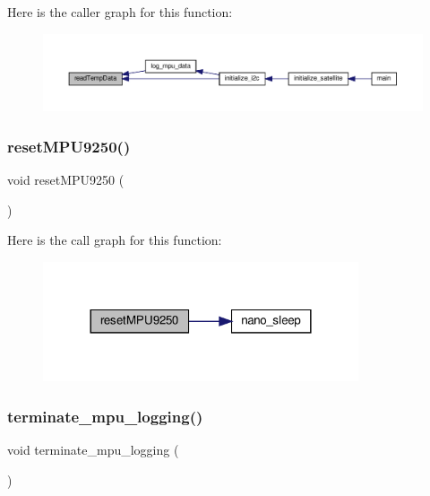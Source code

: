 Here is the caller graph for this function\+:\nopagebreak
\begin{figure}[H]
\begin{center}
\leavevmode
\includegraphics[width=350pt]{i2c-interface_8c_aa12b154e59ddb443b65da8f4458146db_icgraph}
\end{center}
\end{figure}
\mbox{\label{i2c-interface_8c_a34e6720f7e9da9aa7bdd3d3afec24f77}} 
\subsubsection{\texorpdfstring{reset\+M\+P\+U9250()}{resetMPU9250()}}
{\footnotesize\ttfamily void reset\+M\+P\+U9250 (\begin{DoxyParamCaption}{ }\end{DoxyParamCaption})}

Here is the call graph for this function\+:\nopagebreak
\begin{figure}[H]
\begin{center}
\leavevmode
\includegraphics[width=264pt]{i2c-interface_8c_a34e6720f7e9da9aa7bdd3d3afec24f77_cgraph}
\end{center}
\end{figure}
\mbox{\label{i2c-interface_8c_a3644aefb56a2169f316b0f2510ffc56c}} 
\subsubsection{\texorpdfstring{terminate\+\_\+mpu\+\_\+logging()}{terminate\_mpu\_logging()}}
{\footnotesize\ttfamily void terminate\+\_\+mpu\+\_\+logging (\begin{DoxyParamCaption}{ }\end{DoxyParamCaption})}

